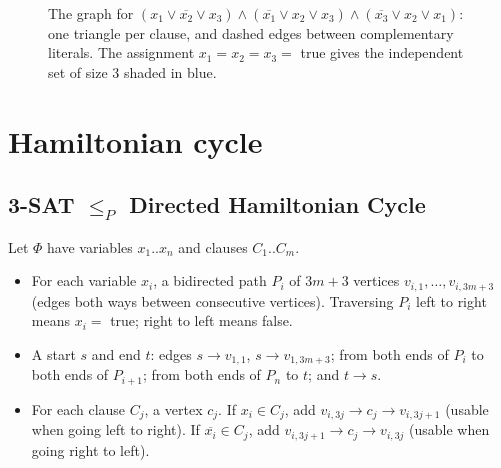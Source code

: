 \begin{figure}[H]
\centering
{}
\caption{The graph for $(x_1\lor\overline{x_2}\lor x_3)\land(\overline{x_1}\lor x_2\lor x_3)\land(\overline{x_3}\lor x_2\lor x_1)$:
one triangle per clause, and dashed edges between complementary literals.
The assignment $x_1=x_2=x_3=$ true gives the independent set of size 3
shaded in blue.}
\end{figure}

\section{Hamiltonian cycle}
\subsection{3-SAT \texorpdfstring{$\le_P$}{<=} Directed Hamiltonian Cycle}
Let $\Phi$ have variables $x_1..x_n$ and clauses $C_1..C_m$.
\begin{itemize}
  \item For each variable $x_i$, a bidirected path $P_i$ of $3m+3$ vertices $v_{i,1},\dots,v_{i,3m+3}$ (edges both ways between consecutive vertices).
        Traversing $P_i$ left to right means $x_i=$ true; right to left means false.
  \item A start $s$ and end $t$: edges $s\to v_{1,1}$, $s\to v_{1,3m+3}$; from both ends of $P_i$ to both ends of $P_{i+1}$; from both ends of $P_n$ to $t$; and $t\to s$.
  \item For each clause $C_j$, a vertex $c_j$. If $x_i\in C_j$, add $v_{i,3j}\to c_j\to v_{i,3j+1}$ (usable when going left to right). If $\overline{x_i}\in C_j$,
        add $v_{i,3j+1}\to c_j\to v_{i,3j}$ (usable when going right to left).
\end{itemize}

